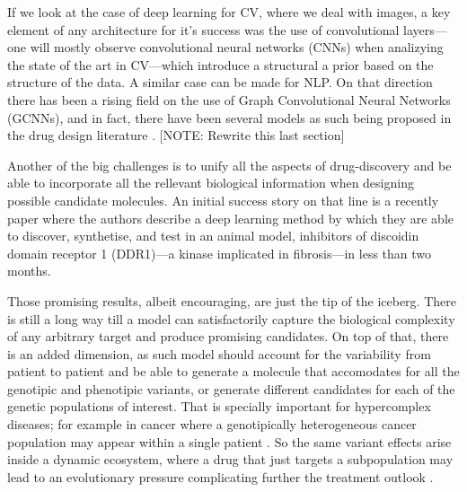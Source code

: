 \documentclass{article}
\begin{document}



 { \color{gray} If we look at the case of deep learning for CV, where we deal with
 images, a key element of any architecture for it's success was the use of convolutional
 layers---one will mostly observe convolutional neural networks (CNNs) when analizying
 the state of the art in CV---which introduce a structural a prior based on the
 structure of the data\cite{Guo2016}. A similar case can be made for
 NLP\cite{Young2018}. On that direction there has been a rising field on the use of
 Graph Convolutional Neural Networks (GCNNs)\cite{Wu2019}, and in fact, there have been
 several models as such being proposed in the drug design literature \cite{Sun2019}.
 [NOTE: Rewrite this last section]}


Another of the big challenges is to unify all the aspects of drug-discovery and be able
 to incorporate all the rellevant biological information when designing possible
 candidate molecules. An initial success story on that line is a recently paper
 \cite{Zhavoronkov2019} where the authors describe a deep learning method by which they
 are able to discover, synthetise, and test in an animal model, inhibitors of discoidin
 domain receptor 1 (DDR1)—a kinase implicated in fibrosis—in less than two months.

Those promising results, albeit encouraging, are just the tip of the iceberg. There is
still a long way till a model can satisfactorily capture the biological complexity of
any arbitrary target and produce promising candidates. On top of that, there is an added
dimension, as such model should account for the variability from patient to patient and
be able to generate a molecule that accomodates for all the genotipic and phenotipic
variants, or generate different candidates for each of the genetic populations of
interest. That is specially important for hypercomplex diseases; for example in cancer
where a genotipically heterogeneous cancer population may appear within a single
patient \cite{Boland2017}. So the same variant effects arise inside a dynamic ecosystem, where a drug that
just targets a subpopulation may lead to an evolutionary pressure complicating further
the treatment outlook \cite{Enriquez-Navas2015}.
\end{document}
